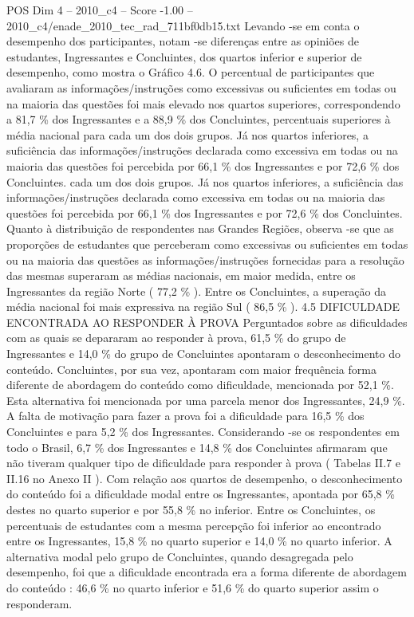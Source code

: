\begin{textsample}{POS Dim 4 – 2010\_c4 – Score -1.00 – 2010\_c4/enade\_2010\_tec\_rad\_711bf0db15.txt}
Levando -se em conta o desempenho dos participantes, notam -se diferenças entre as opiniões de estudantes, Ingressantes e Concluintes, dos quartos inferior e superior de desempenho, como mostra o Gráfico 4.6.
O percentual de participantes que avaliaram as informações/instruções como excessivas ou suficientes em todas ou na maioria das questões foi mais elevado nos quartos superiores, correspondendo a 81,7 \% dos Ingressantes e a 88,9 \% dos Concluintes, percentuais superiores à média nacional para cada um dos dois grupos.
Já nos quartos inferiores, a suficiência das informações/instruções declarada como excessiva em todas ou na maioria das questões foi percebida por 66,1 \% dos Ingressantes e por 72,6 \% dos Concluintes. cada um dos dois grupos.
Já nos quartos inferiores, a suficiência das informações/instruções declarada como excessiva em todas ou na maioria das questões foi percebida por 66,1 \% dos Ingressantes e por 72,6 \% dos Concluintes.
Quanto à distribuição de respondentes nas Grandes Regiões, observa -se que as proporções de estudantes que perceberam como excessivas ou suficientes em todas ou na maioria das questões as informações/instruções fornecidas para a resolução das mesmas superaram as médias nacionais, em maior medida, entre os Ingressantes da região Norte ( 77,2 \% ).
Entre os Concluintes, a superação da média nacional foi mais expressiva na região Sul ( 86,5 \% ). 4.5 DIFICULDADE ENCONTRADA AO RESPONDER À PROVA Perguntados sobre as dificuldades com as quais se depararam ao responder à prova, 61,5 \% do grupo de Ingressantes e 14,0 \% do grupo de Concluintes apontaram o desconhecimento do conteúdo.
Concluintes, por sua vez, apontaram com maior frequência forma diferente de abordagem do conteúdo como dificuldade, mencionada por 52,1 \%.
Esta alternativa foi mencionada por uma parcela menor dos Ingressantes, 24,9 \%.
A falta de motivação para fazer a prova foi a dificuldade para 16,5 \% dos Concluintes e para 5,2 \% dos Ingressantes.
Considerando -se os respondentes em todo o Brasil, 6,7 \% dos Ingressantes e 14,8 \% dos Concluintes afirmaram que não tiveram qualquer tipo de dificuldade para responder à prova ( Tabelas II.7 e II.16 no Anexo II ).
Com relação aos quartos de desempenho, o desconhecimento do conteúdo foi a dificuldade modal entre os Ingressantes, apontada por 65,8 \% destes no quarto superior e por 55,8 \% no inferior.
Entre os Concluintes, os percentuais de estudantes com a mesma percepção foi inferior ao encontrado entre os Ingressantes, 15,8 \% no quarto superior e 14,0 \% no quarto inferior.
A alternativa modal pelo grupo de Concluintes, quando desagregada pelo desempenho, foi que a dificuldade encontrada era a forma diferente de abordagem do conteúdo : 46,6 \% no quarto inferior e 51,6 \% do quarto superior assim o responderam.

\end{textsample}
